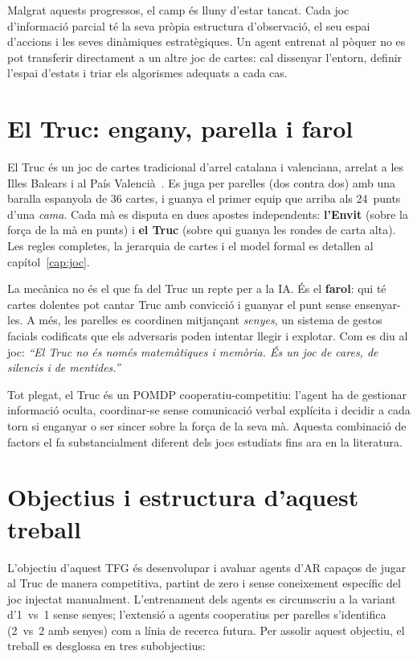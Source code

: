 Malgrat aquests progressos, el camp és lluny d'estar tancat. Cada joc d'informació
parcial té la seva pròpia estructura d'observació, el seu espai d'accions i les seves
dinàmiques estratègiques. Un agent entrenat al pòquer no es pot transferir directament
a un altre joc de cartes: cal dissenyar l'entorn, definir l'espai d'estats i triar els
algorismes adequats a cada cas.

\section{El Truc: engany, parella i farol}

El Truc és un joc de cartes tradicional d'arrel catalana i valenciana, arrelat a les
Illes Balears i al País Valencià~\cite{retruc}. Es juga per parelles (dos contra dos)
amb una baralla espanyola de 36 cartes, i guanya el primer equip que arriba als
24~punts d'una \emph{cama}. Cada mà es disputa en dues apostes independents:
\textbf{l'Envit} (sobre la força de la mà en punts) i \textbf{el Truc} (sobre qui
guanya les rondes de carta alta). Les regles completes, la jerarquia de cartes i
el model formal es detallen al capítol~\ref{cap:joc}.

La mecànica no és el que fa del Truc un repte per a la \ac{IA}. És el \textbf{farol}:
qui té cartes dolentes pot cantar Truc amb convicció i guanyar el punt sense
ensenyar-les. A més, les parelles es coordinen mitjançant \emph{senyes}, un sistema
de gestos facials codificats que els adversaris poden intentar llegir i explotar.
Com es diu al joc: \emph{``El Truc no és només matemàtiques i memòria. És un joc
de cares, de silencis i de mentides.''}

Tot plegat, el Truc és un \ac{POMDP} cooperatiu-competitiu: l'agent ha de gestionar
informació oculta, coordinar-se sense comunicació verbal explícita i decidir a cada
torn si enganyar o ser sincer sobre la força de la seva mà. Aquesta combinació de
factors el fa substancialment diferent dels jocs estudiats fins ara en la literatura.

\section{Objectius i estructura d'aquest treball}

L'objectiu d'aquest \ac{TFG} és desenvolupar i avaluar agents d'\ac{AR} capaços de jugar al Truc de
manera competitiva, partint de zero i sense coneixement específic del joc injectat manualment. L'entrenament dels agents es circumscriu
a la variant d'1~vs~1 sense senyes; l'extensió a agents cooperatius  per
parelles s'identifica (2~vs~2 amb senyes) com a línia de recerca futura. Per assolir aquest objectiu, el treball es desglossa en tres subobjectius:

